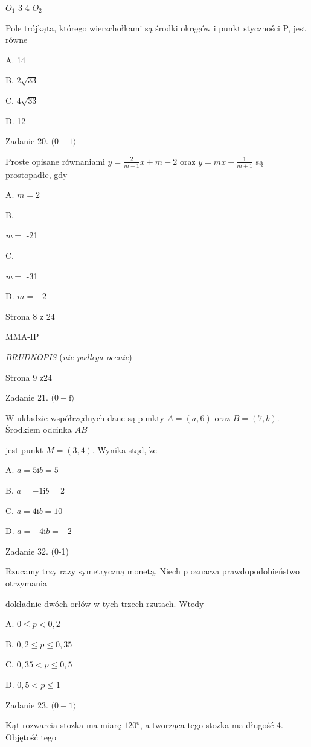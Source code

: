 \documentclass[a4paper,12pt]{article}
\begin{document}
$O_{1}$  3 4  $O_{2}$

Pole trójkąta, którego wierzchołkami są środki okręgów i punkt styczności P, jest równe

A. 14

B. $2\sqrt{33}$

C. $4\sqrt{33}$

D. 12

Zadanie 20. $(0-1\rangle$

Proste opisane równaniami $y=\displaystyle \frac{2}{m-1}x+m-2$ oraz $y=mx+\displaystyle \frac{1}{m+1}$ są prostopadłe, gdy

A. $m=2$

B.

{\it m}$=$ -21

C.

{\it m}$=$ -31

D. $m=-2$

Strona 8 z 24

MMA-IP





{\it BRUDNOPIS} ({\it nie podlega ocenie})

Strona 9 z24





Zadanie 21. $(0-\mathrm{f}\rangle$

$\mathrm{W}$ układzie współrzędnych dane są punkty $A=(a,6)$ oraz $B=(7,b)$. Środkiem odcinka $AB$

jest punkt $M=(3,4)$. Wynika stąd, $\dot{\mathrm{z}}\mathrm{e}$

A. $a=5 \mathrm{i}b=5$

B. $a=-1 \mathrm{i}b=2$

C. $a=4\mathrm{i}b=10$

D. $a=-4 \mathrm{i}b=-2$

Zadanie 32. (0-1)

Rzucamy trzy razy symetryczną monetą. Niech p oznacza prawdopodobieństwo otrzymania

dokładnie dwóch orłów w tych trzech rzutach. Wtedy

A. $0\leq p<0,2$

B. $0,2\leq p\leq 0,35$

C. $0,35<p\leq 0,5$

D. $0,5<p\leq 1$

Zadanie 23. $(0-1\rangle$

Kąt rozwarcia stozka ma miarę $120^{\mathrm{o}}$, a tworząca tego stozka ma długość 4. Objętość tego
\end{document}
